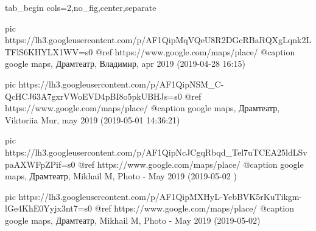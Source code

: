  
 
 
 
 

\ifcmt
  tab_begin cols=2,no_fig,center,separate

     pic https://lh3.googleusercontent.com/p/AF1QipMqVQeU8R2DGcRBaRQXgLqnk2LTFlS6KHYLX1WV=s0
     @ref https://www.google.com/maps/place/%
     @caption google maps, Драмтеатр, Владимир, apr 2019 (2019-04-28 16:15)

     pic https://lh3.googleusercontent.com/p/AF1QipNSM_C-QcHCJ63A7gxrVWoEVD4pBI8o5pkUBHJs=s0
     @ref https://www.google.com/maps/place/%
     @caption google maps, Драмтеатр, Viktoriia Mur, may 2019 (2019-05-01 14:36:21)

     pic https://lh3.googleusercontent.com/p/AF1QipNcJCgqRbqd_Tel7uTCEA25ldLSvpaAXWFpZPif=s0
     @ref https://www.google.com/maps/place/%
     @caption google maps, Драмтеатр, Mikhail M, Photo - May 2019 (2019-05-02 )

     pic https://lh3.googleusercontent.com/p/AF1QipMXHyL-YebBVK5rKuTikgm-lGe4KhE0Yyjx3nt7=s0
     @ref https://www.google.com/maps/place/%
     @caption google maps, Драмтеатр, Mikhail M, Photo - May 2019 (2019-05-02)

